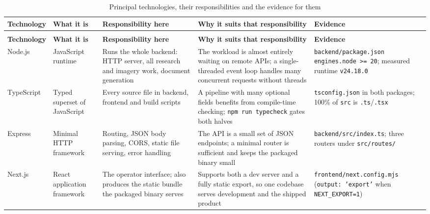 \documentclass[11pt,a4paper]{report}
\newcommand{\code}[1]{\texttt{\small #1}}
\DeclareRobustCommand{\file}[1]{{\small\nolinkurl{#1}}}
\newcommand{\ver}[1]{\texttt{#1}}
\begin{document}
\begin{landscape}
\begin{longtable}{@{}>{\raggedright\arraybackslash}p{2.8cm}>{\raggedright\arraybackslash}p{3.8cm}>{\raggedright\arraybackslash}p{5.0cm}>{\raggedright\arraybackslash}p{5.2cm}>{\raggedright\arraybackslash}p{4.6cm}@{}}
\caption{Principal technologies, their responsibilities and the evidence for them}
\label{tab:why}\\
\toprule
\textbf{Technology} & \textbf{What it is} & \textbf{Responsibility here} &
\textbf{Why it suits that responsibility} & \textbf{Evidence}\\
\midrule
\endfirsthead
\multicolumn{5}{c}{\footnotesize\itshape Table \thetable{} continued}\\
\toprule
\textbf{Technology} & \textbf{What it is} & \textbf{Responsibility here} &
\textbf{Why it suits that responsibility} & \textbf{Evidence}\\
\midrule
\endhead
\bottomrule
\endfoot

Node.js & JavaScript runtime & Runs the whole backend: HTTP server, all research
and imagery work, document generation & The workload is almost entirely waiting
on remote APIs; a single-threaded event loop handles many concurrent requests
without threads & \file{backend/package.json} \code{engines.node >= 20};
measured runtime \ver{v24.18.0}\\

TypeScript & Typed superset of JavaScript & Every source file in backend,
frontend and build scripts & A pipeline with many optional fields benefits from
compile-time checking; \code{npm run typecheck} gates both halves &
\file{tsconfig.json} in both packages; 100\% of \file{src} is \file{.ts}/\file{.tsx}\\

Express & Minimal HTTP framework & Routing, JSON body parsing, CORS, static file
serving, error handling & The API is a small set of JSON endpoints; a minimal
router is sufficient and keeps the packaged binary small &
\file{backend/src/index.ts}; three routers under \file{src/routes/}\\

Next.js & React application framework & The operator interface; also produces the
static bundle the packaged binary serves & Supports both a dev server and a fully
static export, so one codebase serves development and the shipped product &
\file{frontend/next.config.mjs} (\code{output: 'export'} when \code{NEXT\_EXPORT=1})\\


\end{longtable}
\end{landscape}
\end{document}
